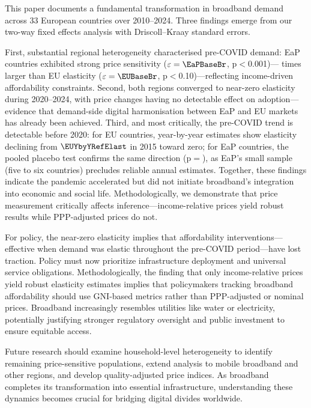 This paper documents a fundamental transformation in broadband demand across 33 European countries over 2010--2024. Three findings emerge from our two-way fixed effects analysis with Driscoll--Kraay standard errors.

First, substantial regional heterogeneity characterised pre-COVID demand: EaP countries exhibited strong price sensitivity ($\varepsilon = \EaPBaseBr$, p$<$0.001)---\EaPEURatio{} times larger than EU elasticity ($\varepsilon = \EUBaseBr$, p$<$0.10)---reflecting income-driven affordability constraints. Second, both regions converged to near-zero elasticity during 2020--2024, with price changes having no detectable effect on adoption---evidence that demand-side digital harmonisation between EaP and EU markets has already been achieved. Third, and most critically, the pre-COVID trend is detectable before 2020: for EU countries, year-by-year estimates show elasticity declining from $\EUYbyYRefElast$ in 2015 toward zero; for EaP countries, the pooled placebo test confirms the same direction (p$=$\PlaceboEaPPval), as EaP's small sample (five to six countries) precludes reliable annual estimates. Together, these findings indicate the pandemic accelerated but did not initiate broadband's integration into economic and social life. Methodologically, we demonstrate that price measurement critically affects inference---income-relative prices yield robust results while PPP-adjusted prices do not.

For policy, the near-zero elasticity implies that affordability interventions---effective when demand was elastic throughout the pre-COVID period---have lost traction. Policy must now prioritize infrastructure deployment and universal service obligations. Methodologically, the finding that only income-relative prices yield robust elasticity estimates implies that policymakers tracking broadband affordability should use GNI-based metrics rather than PPP-adjusted or nominal prices. Broadband increasingly resembles utilities like water or electricity, potentially justifying stronger regulatory oversight and public investment to ensure equitable access.

Future research should examine household-level heterogeneity to identify remaining price-sensitive populations, extend analysis to mobile broadband and other regions, and develop quality-adjusted price indices. As broadband completes its transformation into essential infrastructure, understanding these dynamics becomes crucial for bridging digital divides worldwide.

